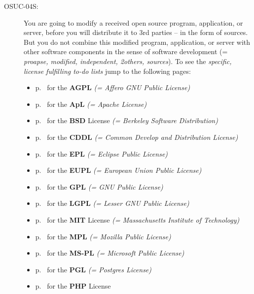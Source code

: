 \begin{description}
\item[OSUC-04S:]\label{OSUC-04S-DEF} You are going to modify a received open
source program, application, or server, before you will distribute it to 3rd
parties -- in the form of sources. But you do not combine this modified program,
application, or server with other software components in the sense of software
development (= \textit{proapse, modified, independent, 2others, sources}).
To see the \textit{specific, license fulfilling to-do lists} jump to the
following pages:
  \begin{itemize}
    \item p.\ \pageref{OSUC-04S-AGPL} for the \textbf{AGPL}
      \textit{(= Affero GNU Public License)} 
    \item p.\ \pageref{OSUC-04S-Apache20} for the \textbf{ApL}
      \textit{(= Apache License)}
    \item p.\ \pageref{OSUC-04S-BSD} for the \textbf{BSD} License
      \textit{(= Berkeley Software Distribution)}
    \item p.\ \pageref{OSUC-04S-CDDL} for the \textbf{CDDL}
      \textit{(= Common Develop and Distribution License)}  
    \item p.\ \pageref{OSUC-04S-EPL} for the \textbf{EPL}
      \textit{(= Eclipse Public License)}     
    \item p.\ \pageref{OSUC-04S-EUPL} for the \textbf{EUPL}
      \textit{(= European Union Public License)} 
    \item p.\ \pageref{OSUC-04S-GPL} for the \textbf{GPL}
       \textit{(= GNU Public License)} 
    \item p.\ \pageref{OSUC-04S-LGPL} for the \textbf{LGPL}
      \textit{(= Lesser GNU Public License)}           
    \item p.\ \pageref{OSUC-04S-MIT} for the \textbf{MIT} License
       \textit{(= Massachusetts Institute of Technology)} 
    \item p.\ \pageref{OSUC-04S-MPL} for the \textbf{MPL}
      \textit{(= Mozilla Public License)}     
    \item p.\ \pageref{OSUC-04S-MS-PL} for the \textbf{MS-PL}
      \textit{(= Microsoft Public License)} 
    \item p.\ \pageref{OSUC-04S-PGL} for the \textbf{PGL}
      \textit{(= Postgres License)} 
    \item p.\ \pageref{OSUC-04S-PHP} for the \textbf{PHP} License 
  \end{itemize}
  

\end{description}
